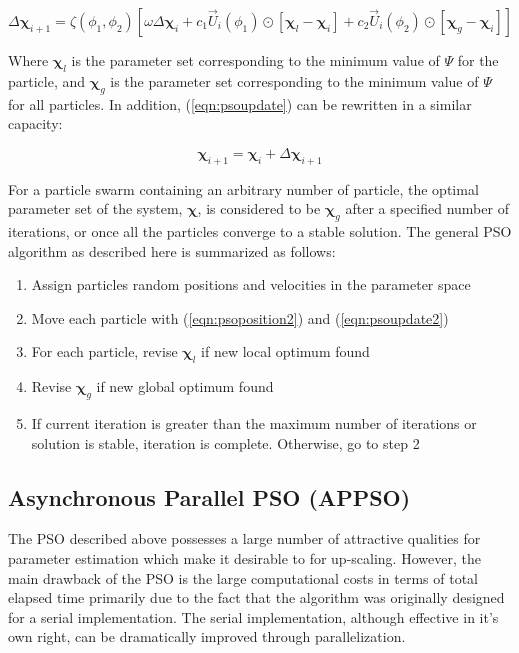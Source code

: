 \begin{equation}
\Delta\boldsymbol{\chi}_{i+1} = \zeta\left(\phi_1, \phi_2\right) \left[\omega\Delta\boldsymbol{\chi}_{i} + c_1\vec{U}_i\left(\phi_1\right)\odot\left[\boldsymbol{\chi}_l-\boldsymbol{\chi}_i\right] + c_2\vec{U}_i\left(\phi_2\right)\odot\left[\boldsymbol{\chi}_g-\boldsymbol{\chi}_i\right]\right]
\label{eqn:psoposition2}
\end{equation}

Where $\boldsymbol{\chi}_l$ is the parameter set corresponding to the minimum value of $\Psi$ for the particle, and $\boldsymbol{\chi}_g$ is the parameter set corresponding to the minimum value of $\Psi$ for all particles. In addition, (\ref{eqn:psoupdate}) can be rewritten in a similar capacity:

\begin{equation}
\boldsymbol{\chi}_{i+1}  = \boldsymbol{\chi}_{i}  +  \Delta\boldsymbol{\chi}_{i+1}
\label{eqn:psoupdate2}
\end{equation}

For a particle swarm containing an arbitrary number of particle, the optimal parameter set of the system, $\boldsymbol{\chi}$, is  considered to be $\boldsymbol{\chi}_g$ after a specified number of iterations, or once all the particles converge to a stable solution. The general PSO algorithm as described here is summarized as follows:

\begin{enumerate}
\item Assign particles random positions and velocities in the parameter space
\item Move each particle with (\ref{eqn:psoposition2}) and (\ref{eqn:psoupdate2})
\item For each particle, revise $\boldsymbol{\chi}_l$ if new local optimum found
\item Revise $\boldsymbol{\chi}_g$ if new global optimum found
\item If current iteration is greater than the maximum number of iterations or solution is stable, iteration is complete. Otherwise, go to step 2
\end{enumerate}

\subsection{Asynchronous Parallel PSO (APPSO)}

The PSO described above possesses a large number of attractive qualities for parameter estimation which make it desirable to for up-scaling.  However, the main drawback of the PSO is the large computational costs in terms of total elapsed time primarily due to the fact that the algorithm was originally designed for a serial implementation. The serial implementation, although effective in it's own right, can be dramatically improved through parallelization. 

